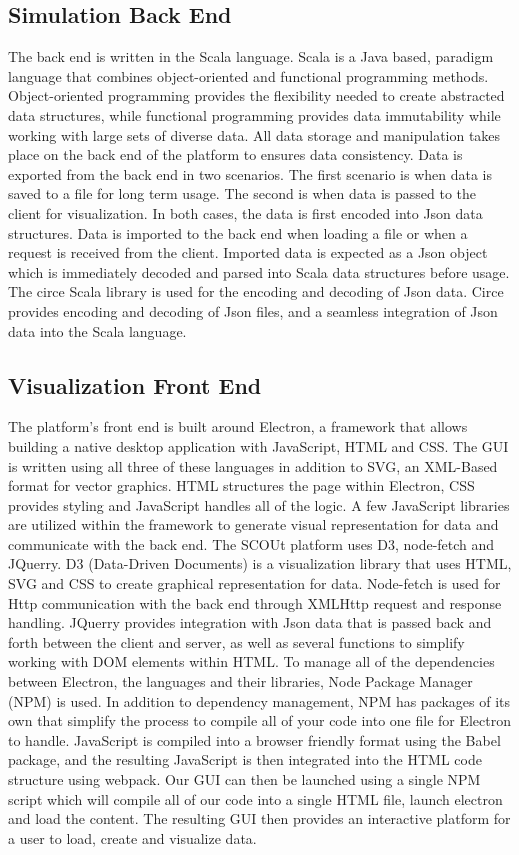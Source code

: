 \subsection{Simulation Back End}
The back end is written in the Scala language.
Scala is a Java based, paradigm language that combines object-oriented and functional programming methods.
Object-oriented programming provides the flexibility needed to create abstracted data structures, while functional programming provides data immutability while working with large sets of diverse data.
All data storage and manipulation takes place on the back end of the platform to ensures data consistency.
Data is exported from the back end in two scenarios.
The first scenario is when data is saved to a file for long term usage.
The second is when data is passed to the client for visualization.
In both cases, the data is first encoded into Json data structures.
Data is imported to the back end when loading a file or when a request is received from the client.
Imported data is expected as a Json object which is immediately decoded and parsed into Scala data structures before usage.
The circe Scala library  is used for the encoding and decoding of Json data.
Circe provides encoding and decoding of Json files, and a seamless integration of Json data into the Scala language.


\subsection{Visualization Front End}
The platform's front end is built around Electron,  a framework that allows building a native desktop application with JavaScript, HTML and CSS.
The GUI is written using all three of these languages in addition to SVG, an XML-Based format for vector graphics.
HTML structures the page within Electron, CSS provides styling and JavaScript handles all of the logic.
A few JavaScript libraries are utilized within the framework to generate visual representation for data and communicate with the back end.
The SCOUt platform uses D3, node-fetch and JQuerry. 
D3 (Data-Driven Documents) is a visualization library that uses HTML, SVG and CSS to create graphical representation for data.
Node-fetch is used for Http communication with the back end through XMLHttp request and response handling.
JQuerry provides integration with Json data that is passed back and forth between the client and server, as well as several functions to simplify working with DOM elements within HTML.
To manage all of the dependencies between Electron, the languages and their libraries, Node Package Manager (NPM)  is used.
In addition to dependency management, NPM has packages of its own that simplify the process to compile all of your code into one file for Electron to handle.
JavaScript is compiled into a browser friendly format using the Babel package, and the resulting JavaScript is then integrated into the HTML code structure using webpack.
Our GUI can then be launched using a single NPM script which will compile all of our code into a single HTML file, launch electron and load the content.
The resulting GUI then provides an interactive platform for a user to load, create and visualize data.


